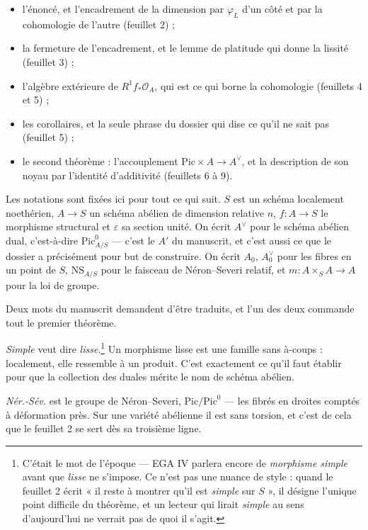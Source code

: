 \documentclass[11pt,a4paper]{article}
\begin{document}
\begin{itemize}
\item l'énoncé, et l'encadrement de la dimension par
  $\varphi_L$ d'un côté et par la cohomologie de l'autre (feuillet 2) ;
\item la fermeture de l'encadrement, et le lemme de platitude qui donne la
  lissité (feuillet 3) ;
\item l'algèbre extérieure de $R^1f_*\mathcal{O}_A$, qui est ce qui borne la
  cohomologie (feuillets 4 et 5) ;
\item les corollaires, et la seule phrase du dossier qui dise ce qu'il ne sait
  pas (feuillet 5) ;
\item le second théorème : l'accouplement
  $\mathrm{Pic} \times A \to A^{\vee}$, et la description de son noyau par
  l'identité d'additivité (feuillets 6 à 9).
\end{itemize}

Les notations sont fixées ici pour tout ce qui suit. $S$ est un schéma
localement noethérien, $A \to S$ un schéma abélien de dimension relative $n$,
$f : A \to S$ le morphisme structural et $\varepsilon$ sa section unité. On
écrit $A^{\vee}$ pour le schéma abélien dual, c'est-à-dire
$\mathrm{Pic}^{0}_{A/S}$ — c'est le $A'$ du manuscrit, et c'est aussi ce que le
dossier a précisément pour but de construire. On écrit $A_{0}$, $A^{\vee}_{0}$
pour les fibres en un point de $S$, $\mathrm{NS}_{A/S}$ pour le faisceau de
Néron--Severi relatif, et $m : A \times_S A \to A$ pour la loi de groupe.

Deux mots du manuscrit demandent d'être traduits, et l'un des deux commande
tout le premier théorème.

\emph{Simple} veut dire \emph{lisse}.\footnote{C'était le mot de l'époque —
EGA IV parlera encore de \emph{morphisme simple} avant que \emph{lisse} ne
s'impose. Ce n'est pas une nuance de style : quand le feuillet 2 écrit « il
reste à montrer qu'il est \emph{simple} sur $S$ », il désigne l'unique point
difficile du théorème, et un lecteur qui lirait \emph{simple} au sens
d'aujourd'hui ne verrait pas de quoi il s'agit.} Un morphisme lisse est une
famille sans à-coups : localement, elle ressemble à un produit. C'est
exactement ce qu'il faut établir pour que la collection des duales mérite le
nom de schéma abélien.

\emph{Nér.-Sév.} est le groupe de Néron--Severi, $\mathrm{Pic}/\mathrm{Pic}^{0}$
— les fibrés en droites comptés à déformation près. Sur une variété abélienne
il est sans torsion, et c'est de cela que le feuillet 2 se sert dès sa
troisième ligne.
\end{document}
